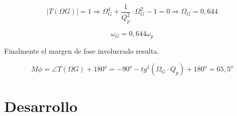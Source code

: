 \documentclass[12pt,A4paper,titlepage]{article}
\begin{document}
\begin{equation}
    |T(\Omega G)| = 1 \Longrightarrow \Omega _G ^4 + \frac{1}{Q_p^2} \cdot \Omega_G^2 - 1 = 0 \Longrightarrow \Omega _G = 0,644
\end{equation}

\begin{equation}
    \omega _G = 0,644 \omega _p
\end{equation}

\bigskip
\hspace{1mm} Finalmente el margen de fase involucrado resulta.

\begin{equation}
    M \phi = \angle T(\Omega G) + 180 ^o = -90^o - tg^1 ( \Omega _G \cdot Q_p) + 180^o = 65,5^o 
\end{equation}
\newpage
\section{Desarrollo}

\newpage

\newpage

\newpage
\end{document}
